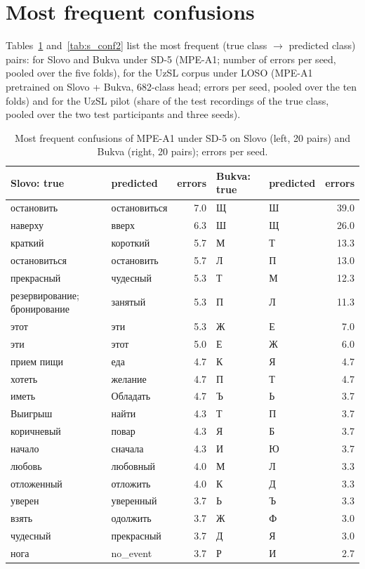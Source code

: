 \documentclass[a4paper,10pt]{article}
\newcommand{\ruT}[1]{{\fontencoding{T2A}\selectfont #1}}
\begin{document}
\section{Most frequent confusions}
Tables~\ref{tab:s_conf1} and~\ref{tab:s_conf2} list the most frequent (true class $\rightarrow$ predicted class) pairs: for Slovo and Bukva under SD-5 (MPE-A1; number of errors per seed, pooled over the five folds), for the UzSL corpus under LOSO (MPE-A1 pretrained on Slovo + Bukva, 682-class head; errors per seed, pooled over the ten folds) and for the UzSL pilot (share of the test recordings of the true class, pooled over the two test participants and three seeds).
\begin{table}[H]
\caption{Most frequent confusions of MPE-A1 under SD-5 on Slovo (left, 20 pairs) and Bukva (right, 20 pairs); errors per seed.}\label{tab:s_conf1}
\centering
\scriptsize
\begin{tabular}{llr|llr}
\toprule
\textbf{Slovo: true} & \textbf{predicted} & \textbf{errors} & \textbf{Bukva: true} & \textbf{predicted} & \textbf{errors} \\
\midrule
\ruT{остановить} & \ruT{остановиться} & 7.0 & \ruT{Щ} & \ruT{Ш} & 39.0 \\
\ruT{наверху} & \ruT{вверх} & 6.3 & \ruT{Ш} & \ruT{Щ} & 26.0 \\
\ruT{краткий} & \ruT{короткий} & 5.7 & \ruT{М} & \ruT{Т} & 13.3 \\
\ruT{остановиться} & \ruT{остановить} & 5.7 & \ruT{Л} & \ruT{П} & 13.0 \\
\ruT{прекрасный} & \ruT{чудесный} & 5.3 & \ruT{Т} & \ruT{М} & 12.3 \\
\ruT{резервирование; бронирование} & \ruT{занятый} & 5.3 & \ruT{П} & \ruT{Л} & 11.3 \\
\ruT{этот} & \ruT{эти} & 5.3 & \ruT{Ж} & \ruT{Е} & 7.0 \\
\ruT{эти} & \ruT{этот} & 5.0 & \ruT{Е} & \ruT{Ж} & 6.0 \\
\ruT{прием пищи} & \ruT{еда} & 4.7 & \ruT{К} & \ruT{Я} & 4.7 \\
\ruT{хотеть} & \ruT{желание} & 4.7 & \ruT{П} & \ruT{Т} & 4.7 \\
\ruT{иметь} & \ruT{Обладать} & 4.7 & \ruT{Ъ} & \ruT{Ь} & 3.7 \\
\ruT{Выигрыш} & \ruT{найти} & 4.3 & \ruT{Т} & \ruT{П} & 3.7 \\
\ruT{коричневый} & \ruT{повар} & 4.3 & \ruT{Я} & \ruT{Б} & 3.7 \\
\ruT{начало} & \ruT{сначала} & 4.3 & \ruT{И} & \ruT{Ю} & 3.7 \\
\ruT{любовь} & \ruT{любовный} & 4.0 & \ruT{М} & \ruT{Л} & 3.3 \\
\ruT{отложенный} & \ruT{отложить} & 4.0 & \ruT{К} & \ruT{Д} & 3.3 \\
\ruT{уверен} & \ruT{уверенный} & 3.7 & \ruT{Ь} & \ruT{Ъ} & 3.3 \\
\ruT{взять} & \ruT{одолжить} & 3.7 & \ruT{Ж} & \ruT{Ф} & 3.0 \\
\ruT{чудесный} & \ruT{прекрасный} & 3.7 & \ruT{Д} & \ruT{Я} & 3.0 \\
\ruT{нога} & no\_event & 3.7 & \ruT{Р} & \ruT{И} & 2.7 \\
\bottomrule
\end{tabular}
\end{table}
\end{document}
